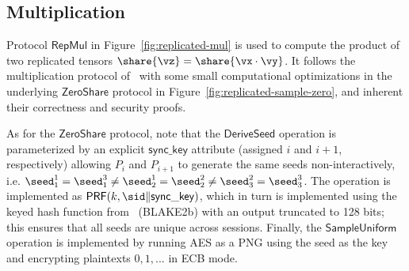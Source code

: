 \subsection{Multiplication}

Protocol $\mathsf{RepMul}$ in Figure~\ref{fig:replicated-mul} is used to compute the product of two replicated tensors $\share{\vz} = \share{\vx \cdot \vy}$. It follows the multiplication protocol of~\cite{CCS:AFLNO16} with some small computational optimizations in the underlying $\mathsf{ZeroShare}$ protocol in Figure~\ref{fig:replicated-sample-zero}, and inherent their correctness and security proofs.

As for the $\mathsf{ZeroShare}$ protocol, note that the $\mathsf{DeriveSeed}$ operation is parameterized by an explicit $\mathsf{sync\_key}$ attribute (assigned $i$ and $i+1$, respectively) allowing $P_i$ and $P_{i+1}$ to generate the same seeds non-interactively, i.e. $\seed^1_1 = \seed^3_1 \not = \seed^1_2 = \seed^2_2 \not = \seed^2_3 = \seed^3_3$. The operation is implemented as $\mathsf{PRF}(k, \sid \| \mathsf{sync\_key})$, which in turn is implemented using the keyed hash function from~\cite{libsodium} (BLAKE2b) with an output truncated to 128 bits; this ensures that all seeds are unique across sessions. Finally, the $\mathsf{SampleUniform}$ operation is implemented by running AES as a PNG using the seed as the key and encrypting plaintexts $0, 1, ...$ in ECB mode.


